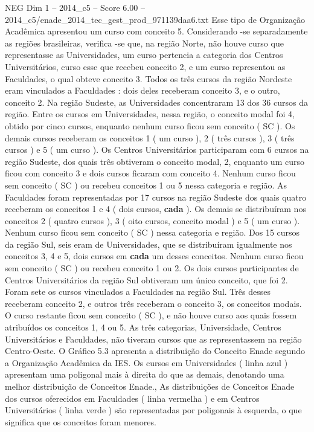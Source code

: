 \begin{textsample}{NEG Dim 1 – 2014\_c5 – Score 6.00 – 2014\_c5/enade\_2014\_tec\_gest\_prod\_971139daa6.txt}
Esse tipo de Organização Acadêmica apresentou um curso com conceito 5.
Considerando -se separadamente as regiões brasileiras, verifica -se que, na região Norte, não houve curso que representasse as Universidades, um curso pertencia a categoria dos Centros Universitários, curso esse que recebeu conceito 2, e um curso representou as Faculdades, o qual obteve conceito 3.
Todos os três cursos da região Nordeste eram vinculados a Faculdades : dois deles receberam conceito 3, e o outro, conceito 2.
Na região Sudeste, as Universidades concentraram 13 dos 36 cursos da região.
Entre os cursos em Universidades, nessa região, o conceito modal foi 4, obtido por cinco cursos, enquanto nenhum curso ficou sem conceito ( SC ).
Os demais cursos receberam os conceitos 1 ( um curso ), 2 ( três cursos ), 3 ( três cursos ) e 5 ( um curso ).
Os Centros Universitários participaram com 6 cursos na região Sudeste, dos quais três obtiveram o conceito modal, 2, enquanto um curso ficou com conceito 3 e dois cursos ficaram com conceito 4.
Nenhum curso ficou sem conceito ( SC ) ou recebeu conceitos 1 ou 5 nessa categoria e região.
As Faculdades foram representadas por 17 cursos na região Sudeste dos quais quatro receberam os conceitos 1 e 4 ( dois cursos, \textbf{cada} ).
Os demais se distribuíram nos conceitos 2 ( quatro cursos ), 3 ( oito cursos, conceito modal ) e 5 ( um curso ).
Nenhum curso ficou sem conceito ( SC ) nessa categoria e região.
Dos 15 cursos da região Sul, seis eram de Universidades, que se distribuíram igualmente nos conceitos 3, 4 e 5, dois cursos em \textbf{cada} um desses conceitos.
Nenhum curso ficou sem conceito ( SC ) ou recebeu conceito 1 ou 2.
Os dois cursos participantes de Centros Universitários da região Sul obtiveram um único conceito, que foi 2.
Foram sete os cursos vinculados a Faculdades na região Sul.
Três desses receberam conceito 2, e outros três receberam o conceito 3, os conceitos modais.
O curso restante ficou sem conceito ( SC ), e não houve curso aos quais fossem atribuídos os conceitos 1, 4 ou 5.
As três categorias, Universidade, Centros Universitários e Faculdades, não tiveram cursos que as representassem na região Centro-Oeste.
O Gráfico 5.3 apresenta a distribuição do Conceito Enade segundo a Organização Acadêmica da IES.
Os cursos em Universidades ( linha azul ) apresentam uma poligonal mais à direita do que as demais, denotando uma melhor distribuição de Conceitos Enade., As distribuições de Conceitos Enade dos cursos oferecidos em Faculdades ( linha vermelha ) e em Centros Universitários ( linha verde ) são representadas por poligonais à esquerda, o que significa que os conceitos foram menores.

\end{textsample}
